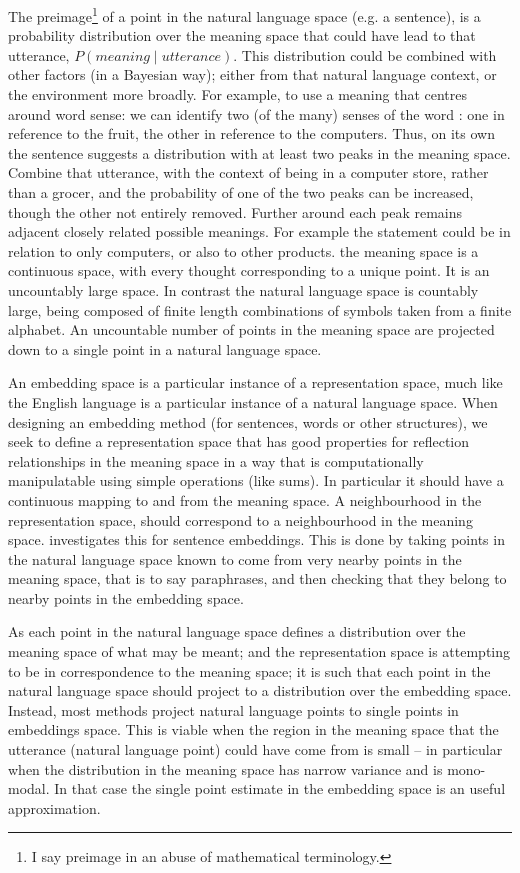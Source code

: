 \documentclass{book}
\begin{document}
The preimage\footnote{I say preimage in an abuse of mathematical terminology.} of a point in the natural language space (e.g. a sentence),
is a probability distribution over the meaning space that could have lead to that utterance, $P(meaning \mid utterance)$.
This distribution could be combined with other factors (in a Bayesian way); either from that natural language context, or the environment more broadly.
For example, to use a meaning that centres around word sense:
we can identify two (of the many) senses of the word :
one in reference to the fruit, the other in reference to the computers.
Thus, on its own the sentence 
suggests a distribution with at least two peaks in the meaning space.
Combine that utterance, with the context of being in a computer store, rather than a grocer, and the probability of one of the two peaks can be increased, though the other not entirely removed.
Further around each peak remains adjacent closely related possible meanings.
For example the statement could be in relation to only computers, or also to other products.
the meaning space is a continuous space, with every thought corresponding to a unique point. It is an uncountably large space.
In contrast the natural language space is countably large, being composed of finite length combinations of symbols taken from a finite alphabet.
An uncountable number of points in the meaning space are projected down to a single point in a natural language space.


An embedding space is a particular instance of a representation space, 
much like the English language is a particular instance of a natural language space.
When designing an embedding method (for sentences, words or other structures),
we seek to define a representation space
that has good properties for reflection relationships in the meaning space in a way that is computationally manipulatable using simple operations (like sums).
In particular it should have a continuous mapping to and from the meaning space.
A neighbourhood in the representation space, should correspond to a neighbourhood in the meaning space.
 investigates this for sentence embeddings.
This is done by taking points in the natural language space known to come from very nearby points in the meaning space, that is to say paraphrases,
and then checking that they belong to nearby points in the embedding space.


As each point in the natural language space defines a distribution over the meaning space of what may be meant;
and the representation space is attempting to be in correspondence to the meaning space;
it is such that each point in the natural language space should project to a distribution over the embedding space.
Instead, most methods project natural language points to single points in embeddings space.
This is viable when the region in the meaning space that the utterance (natural language point) could have come from is small -- in particular when the distribution in the meaning space has narrow variance and is mono-modal.
In that case the single point estimate in the embedding space is an useful approximation.
\end{document}
